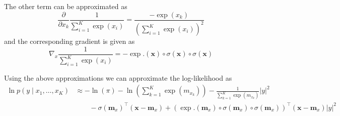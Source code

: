 The other term can be approximated as
\begin{equation}
    \frac{\partial}{\partial x_k} \frac{1}{\sum_{i=1}^K \exp(x_i)} = \frac{-\exp(x_k)}{\left(\sum_{i=1}^K \exp(x_i)\right)^2}
\end{equation}
and the corresponding gradient is given as 
\begin{equation}
    \nabla_x \frac{1}{\sum_{i=1}^K \exp(x_i)} = -\exp.(\bm{x}) \circ \sigma(\bm{x}) \circ \sigma(\bm{x})
\end{equation}

Using the above approximations we can approximate the log-likelihood as
\begin{equation}
    \begin{split}
        \ln p(y\mid x_1, \ldots, x_K) 
        &\approx -\ln(\pi) -\ln\left(\sum_{k=1}^K \exp(m_{x_k})\right) -\frac{1}{\sum_{k=1}^K \exp(m_{x_k})}|y|^2 \\
        &\qquad - \sigma(\bm{m}_x)^\top (\bm{x} - \bm{m}_x) + (\exp.(\bm{m}_x) \circ \sigma(\bm{m}_x) \circ \sigma(\bm{m}_x))^\top (\bm{x}-\bm{m}_x)|y|^2
    \end{split}
\end{equation}